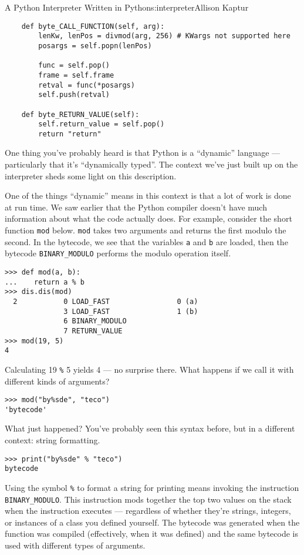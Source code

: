 \begin{aosachapter}{A Python Interpreter Written in Python}{s:interpreter}{Allison Kaptur}
\begin{verbatim}
    def byte_CALL_FUNCTION(self, arg):
        lenKw, lenPos = divmod(arg, 256) # KWargs not supported here
        posargs = self.popn(lenPos)

        func = self.pop()
        frame = self.frame
        retval = func(*posargs)
        self.push(retval)

    def byte_RETURN_VALUE(self):
        self.return_value = self.pop()
        return "return"
\end{verbatim}

\label{dynamic-typing-what-the-compiler-doesnt-know}

One thing you've probably heard is that Python is a ``dynamic'' language
--- particularly that it's ``dynamically typed''. The context we've just
built up on the interpreter sheds some light on this description.

One of the things ``dynamic'' means in this context is that a lot of
work is done at run time. We saw earlier that the Python compiler
doesn't have much information about what the code actually does. For
example, consider the short function \texttt{mod} below. \texttt{mod}
takes two arguments and returns the first modulo the second. In the
bytecode, we see that the variables \texttt{a} and \texttt{b} are
loaded, then the bytecode \texttt{BINARY\_MODULO} performs the modulo
operation itself.

\begin{verbatim}
>>> def mod(a, b):
...    return a % b
>>> dis.dis(mod)
  2           0 LOAD_FAST                0 (a)
              3 LOAD_FAST                1 (b)
              6 BINARY_MODULO
              7 RETURN_VALUE
>>> mod(19, 5)
4
\end{verbatim}

Calculating 19 \texttt{\%} 5 yields 4 --- no surprise there. What
happens if we call it with different kinds of arguments?

\begin{verbatim}
>>> mod("by%sde", "teco")
'bytecode'
\end{verbatim}

What just happened? You've probably seen this syntax before, but in a
different context: string formatting.

\begin{verbatim}
>>> print("by%sde" % "teco")
bytecode
\end{verbatim}

Using the symbol \texttt{\%} to format a string for printing means
invoking the instruction \texttt{BINARY\_MODULO}. This instruction mods
together the top two values on the stack when the instruction executes
--- regardless of whether they're strings, integers, or instances of a
class you defined yourself. The bytecode was generated when the function
was compiled (effectively, when it was defined) and the same bytecode is
used with different types of arguments.


\end{aosachapter}
